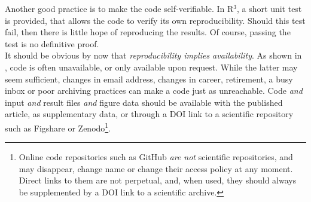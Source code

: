\documentclass[a4paper,11pt]{article}
\begin{document}
Another good practice is to make the code self-verifiable. In R$^3$, a short unit test is provided, that allows the code to verify its own reproducibility. Should this test fail, then there is little hope of reproducing the results. Of course, passing the test is no definitive proof.\\

It should be obvious by now that \emph{reproducibility implies availability}. As shown in \citep{Collberg:2016}, code is often unavailable, or only available upon request. While the latter may seem sufficient, changes in email address, changes in career, retirement, a busy inbox or poor archiving practices can make a code just as unreachable. Code \emph{and} input \emph{and} result files \emph{and} figure data should be available with the published article, as supplementary data, or through a DOI link to a scientific repository such as Figshare or Zenodo\footnote{Online code repositories such as GitHub \emph{are not} scientific repositories, and may disappear, change name or change their access policy at any moment. Direct links to them are not perpetual, and, when used, they should always be supplemented by a DOI link to a scientific archive.}.\\
\end{document}
